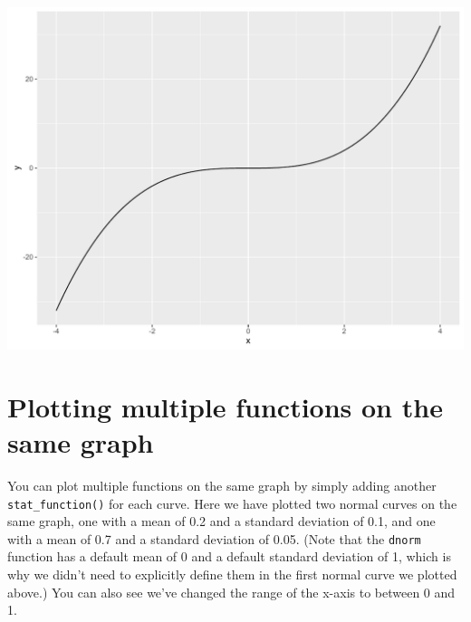 \begin{Shaded}
\begin{Highlighting}[]
\StringTok{ }
\StringTok{      } \NormalTok{*}\StringTok{ }
\NormalTok{\}}

\StringTok{ }\NormalTok{(}\NormalTok{(} \NormalTok{(-}\NormalTok{, }\NormalTok{)), }\NormalTok{(} 
\StringTok{      }\NormalTok{(} 
\end{Highlighting}
\end{Shaded}

\begin{center}\includegraphics[width=0.55\linewidth]{figures/function_3-1} \end{center}

\section{Plotting multiple functions on the same
graph}\label{plotting-multiple-functions-on-the-same-graph}

You can plot multiple functions on the same graph by simply adding
another \texttt{stat\_function()} for each curve. Here we have plotted
two normal curves on the same graph, one with a mean of 0.2 and a
standard deviation of 0.1, and one with a mean of 0.7 and a standard
deviation of 0.05. (Note that the \texttt{dnorm} function has a default
mean of 0 and a default standard deviation of 1, which is why we didn't
need to explicitly define them in the first normal curve we plotted
above.) You can also see we've changed the range of the x-axis to
between 0 and 1.

